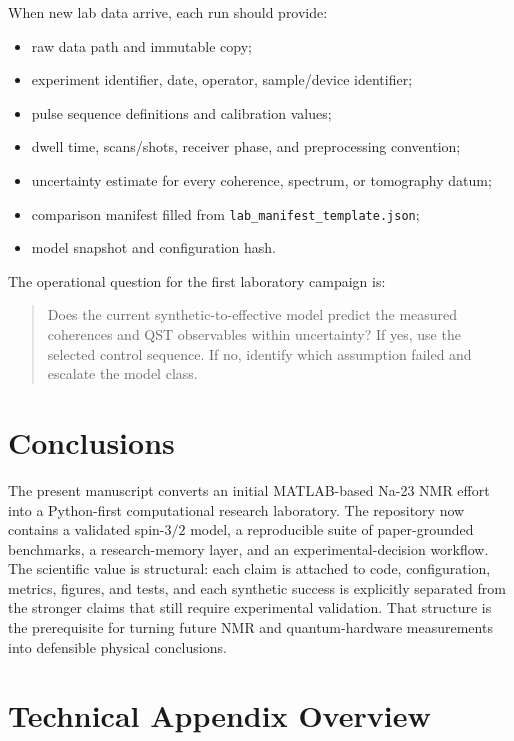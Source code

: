 \documentclass[11pt,a4paper]{article}
\begin{document}
When new lab data arrive, each run should provide:
\begin{itemize}
  \item raw data path and immutable copy;
  \item experiment identifier, date, operator, sample/device identifier;
  \item pulse sequence definitions and calibration values;
  \item dwell time, scans/shots, receiver phase, and preprocessing convention;
  \item uncertainty estimate for every coherence, spectrum, or tomography datum;
  \item comparison manifest filled from
  \texttt{lab\_manifest\_template.json};
  \item model snapshot and configuration hash.
\end{itemize}

The operational question for the first laboratory campaign is:
\begin{quote}
Does the current synthetic-to-effective model predict the measured coherences
and QST observables within uncertainty?  If yes, use the selected control
sequence.  If no, identify which assumption failed and escalate the model
class.
\end{quote}

\section{Conclusions}

The present manuscript converts an initial MATLAB-based Na-23 NMR effort into a
Python-first computational research laboratory.  The repository now contains a
validated spin-$3/2$ model, a reproducible suite of paper-grounded benchmarks,
a research-memory layer, and an experimental-decision workflow.  The scientific
value is structural: each claim is attached to code, configuration, metrics,
figures, and tests, and each synthetic success is explicitly separated from the
stronger claims that still require experimental validation.  That structure is
the prerequisite for turning future NMR and quantum-hardware measurements into
defensible physical conclusions.

\appendix

\section{Technical Appendix Overview}
\end{document}
